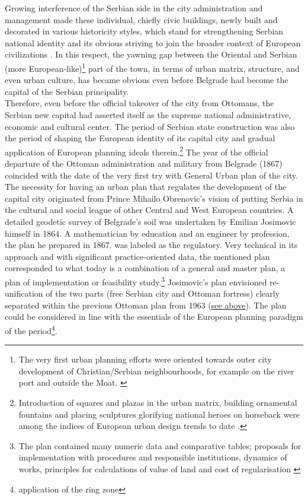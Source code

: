 \documentclass[11pt]{report}
\begin{document}
Growing interference of the Serbian side in the city administration and management made these individual, chiefly civic buildings, newly built and decorated in various historicity styles, which stand for strengthening Serbian national identity and its obvious striving to join the broader context of European civilizations \href{}{\citealt{hirt_belgrade_2009}}.
In this respect, the yawning gap between the Oriental and Serbian (more European-like)\footnote{The very first urban planning efforts were oriented towards outer city development of Christian/Serbian neighbourhoods, for example on the river port and outside the Moat. \href{}{\citealt{blagojevic_urban_2009}}}
part of the town, in terms of urban matrix, structure, and even urban culture, has became obvious even before Belgrade had become the capital of the Serbian principality.
\\

Therefore, even before the official takeover of the city from Ottomans, the Serbian new capital had asserted itself as the supreme national administrative, economic and cultural center.
The period of Serbian state construction was also the period of shaping the European identity of its capital city and gradual application of European planning ideals therein.\footnote{Introduction of squares and plazas in the urban matrix, building ornamental fountains and placing sculptures glorifying national heroes on horseback were among the indices of European urban design trends to date \href{}{\citealt{hirt_belgrade_2009}}.}
The year of the official departure of the Ottoman administration and military from Belgrade (1867) coincided with the date of the very first try with General Urban plan of the city.
\\

The necessity for having an urban plan that regulates the development of the capital city originated from Prince Mihailo Obrenovic's vision of putting Serbia in the cultural and social league of other Central and West European countries.
A detailed geodetic survey of Belgrade's soil was undertaken by Emilian Josimovic himself in 1864.
A mathematician by education and an engineer by profession, the plan he prepared in 1867. was labeled as the regulatory.
Very technical in its approach and with significant practice-oriented data, the mentioned plan corresponded to what today is a combination of a general and master plan, a plan of implementation or feasibility study.\footnote{The plan contained many numeric data and comparative tables; proposals  for  implementation with procedures and responsible institutions, dynamics of works, principles for calculations of value of land and cost of regularisation \href{}{\citealt{blagojevic_urban_2009}}}
Josimovic's plan envisioned re-unification of the two parts (free Serbian city and Ottoman fortress) clearly separated within the previous Ottoman plan from 1963 (\href{see above}{see above}). The plan could be considered in line with the essentials of the European planning paradigm of the period\footnote{application of the ring zone}. 
\\
\end{document}
